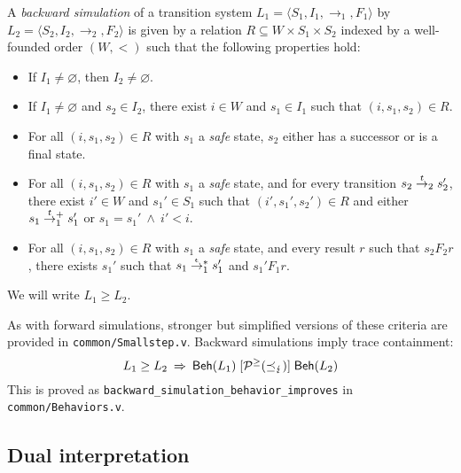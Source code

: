 \documentclass[sigplan,10pt,authordraft]{acmart}
\begin{document}
\begin{definition} %
A \emph{backward simulation}
of a transition system
$L_1 = \langle S_1, I_1, {\rightarrow}_1, F_1 \rangle$
by
$L_2 = \langle S_2, I_2, {\rightarrow}_2, F_2 \rangle$
is given by a relation $R \subseteq W \times S_1 \times S_2$
indexed by a well-founded order $(W, {<})$
such that the following properties hold:
\begin{itemize}
  \item If $I_1 \ne \varnothing$, then $I_2 \ne \varnothing$.
  \item If $I_1 \ne \varnothing$ and $s_2 \in I_2$,
    there exist $i \in W$ and $s_1 \in I_1$
    such that $(i, s_1, s_2) \in R$.
  \item For all $(i, s_1, s_2) \in R$
    with $s_1$ a \emph{safe} state,
    $s_2$ either has a successor or
    is a final state.
  \item For all $(i, s_1, s_2) \in R$
    with $s_1$ a \emph{safe} state,
    and for every transition
    $s_2 \mathrel{\smash{\stackrel{t}{\rightarrow}}_2} s_2'$,
    there exist $i' \in W$ and $s_1' \in S_1$
    such that $(i', s_1', s_2') \in R$ and either
    $s_1 \mathrel{\smash{\stackrel{t}{\rightarrow}}_1^+} s_1'$ or
    $s_1 = s_1' \:\wedge\: i' < i$.
  \item For all $(i, s_1, s_2) \in R$
    with $s_1$ a \emph{safe} state,
    and every result $r$ such that $s_2 \mathrel{F_2} r$,
    there exists $s_1'$ such that
    $s_1 \mathrel{\smash{\stackrel{\epsilon}{\rightarrow}}_1^*} s_1'$ and
    $s_1' \mathrel{F_1} r$.
\end{itemize}
We will write $L_1 \ge L_2$.
\end{definition}

As with forward simulations,
stronger but simplified versions
of these criteria
are provided in \texttt{common/Smallstep.v}.
Backward simulations imply trace containment:
\[
  L_1 \ge L_2
  \: \Rightarrow \:
   \mathsf{Beh} (L_1) \mathrel{[{\mathcal{P}^\ge(\preceq_\lightning)}]}  \mathsf{Beh} (L_2)
\]
This is proved as \texttt{backward\_simulation\_behavior\_improves}
in \texttt{common/Behaviors.v}.


\subsection{Dual interpretation} %
\end{document}
